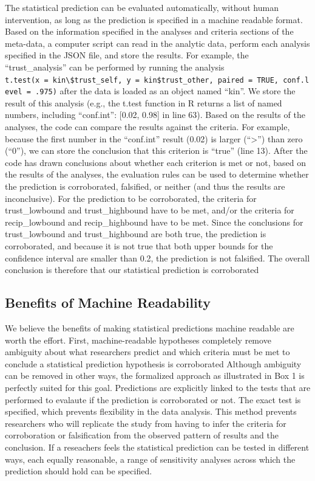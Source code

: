 \documentclass[doc,floatsintext]{apa6}
\begin{document}
The statistical prediction can be evaluated automatically, without human intervention, as long as the prediction is specified in a machine readable format. Based on the information specified in the analyses and criteria sections of the meta-data, a computer script can read in the analytic data, perform each analysis specified in the JSON file, and store the results. For example, the \enquote{trust\_analysis} can be performed by running the analysis \texttt{t.test(x\ =\ kin\textbackslash{}\$trust\_self,\ y\ =\ kin\$trust\_other,\ paired\ =\ TRUE,\ conf.level\ =\ .975)} after the data is loaded as an object named \enquote{kin}. We store the result of this analysis (e.g., the t.test function in R returns a list of named numbers, including \enquote{conf.int}: {[}0.02, 0.98{]} in line 63). Based on the results of the analyses, the code can compare the results against the criteria. For example, because the first number in the \enquote{conf.int} result (0.02) is larger (\enquote{\textgreater{}}) than zero (\enquote{0}), we can store the conclusion that this criterion is \enquote{true} (line 13). After the code has drawn conclusions about whether each criterion is met or not, based on the results of the analyses, the evaluation rules can be used to determine whether the prediction is corroborated, falsified, or neither (and thus the results are inconclusive). For the prediction to be corroborated, the criteria for trust\_lowbound and trust\_highbound have to be met, and/or the criteria for recip\_lowbound and recip\_highbound have to be met. Since the conclusions for trust\_lowbound and trust\_highbound are both true, the prediction is corroborated, and because it is not true that both upper bounds for the confidence interval are smaller than 0.2, the prediction is not falsified. The overall conclusion is therefore that our statistical prediction is corroborated

\hypertarget{benefits-of-machine-readability}{%
\subsection{Benefits of Machine Readability}\label{benefits-of-machine-readability}}

We believe the benefits of making statistical predictions machine readable are worth the effort. First, machine-readable hypotheses completely remove ambiguity about what researchers predict and which criteria must be met to conclude a statistical prediction hypothesis is corroborated Although ambiguity can be removed in other ways, the formalized approach as illustrated in Box 1 is perfectly suited for this goal. Predictions are explicitly linked to the tests that are performed to evalaute if the prediction is corroborated or not. The exact test is specified, which prevents flexibility in the data analysis. This method prevents researchers who will replicate the study from having to infer the criteria for corroboration or falsification from the observed pattern of results and the conclusion. If a reseachers feels the statistical prediction can be tested in different ways, each equally reasonable, a range of sensitivity analyses across which the prediction should hold can be specified.
\end{document}
